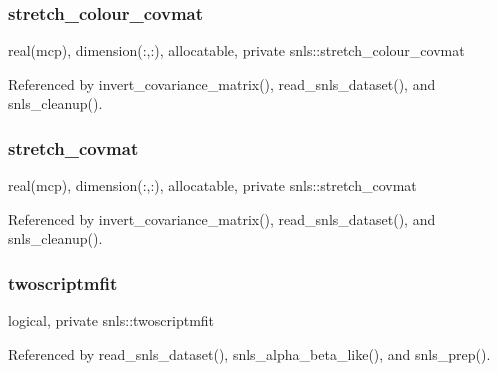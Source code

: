 \mbox{\label{namespacesnls_ad9f9a58ffeb62ad8e3c79c1c06f4fc1f}} 
\subsubsection{\texorpdfstring{stretch\+\_\+colour\+\_\+covmat}{stretch\_colour\_covmat}}
{\footnotesize\ttfamily real(mcp), dimension(\+:,\+:), allocatable, private snls\+::stretch\+\_\+colour\+\_\+covmat\hspace{0.3cm}{\ttfamily [private]}}



Referenced by invert\+\_\+covariance\+\_\+matrix(), read\+\_\+snls\+\_\+dataset(), and snls\+\_\+cleanup().

\mbox{\label{namespacesnls_a56f3f501856e1777e0bb4960509f5d85}} 
\subsubsection{\texorpdfstring{stretch\+\_\+covmat}{stretch\_covmat}}
{\footnotesize\ttfamily real(mcp), dimension(\+:,\+:), allocatable, private snls\+::stretch\+\_\+covmat\hspace{0.3cm}{\ttfamily [private]}}



Referenced by invert\+\_\+covariance\+\_\+matrix(), read\+\_\+snls\+\_\+dataset(), and snls\+\_\+cleanup().

\mbox{\label{namespacesnls_aa5648511eb2e907f92a3a833acaafd98}} 
\subsubsection{\texorpdfstring{twoscriptmfit}{twoscriptmfit}}
{\footnotesize\ttfamily logical, private snls\+::twoscriptmfit\hspace{0.3cm}{\ttfamily [private]}}



Referenced by read\+\_\+snls\+\_\+dataset(), snls\+\_\+alpha\+\_\+beta\+\_\+like(), and snls\+\_\+prep().

